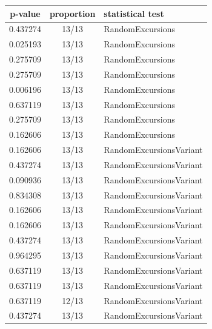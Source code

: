 \documentclass[conference]{IEEEtran}
\begin{document}
\begin{center}
\begin{table}[H]
\renewcommand{\arraystretch}{1.2}
\centering
\begin{tabular}{|c|c|l|}
\hline
\textbf{p-value} & \textbf{proportion} & \textbf{statistical test} \\ \hline
0.437274         & 13/13               & RandomExcursions          \\ \hline
0.025193         & 13/13               & RandomExcursions          \\ \hline
0.275709         & 13/13               & RandomExcursions          \\ \hline
0.275709         & 13/13               & RandomExcursions          \\ \hline
0.006196         & 13/13               & RandomExcursions          \\ \hline
0.637119         & 13/13               & RandomExcursions          \\ \hline
0.275709         & 13/13               & RandomExcursions          \\ \hline
0.162606         & 13/13               & RandomExcursions          \\ \hline
0.162606         & 13/13               & RandomExcursionsVariant   \\ \hline
0.437274         & 13/13               & RandomExcursionsVariant   \\ \hline
0.090936         & 13/13               & RandomExcursionsVariant   \\ \hline
0.834308         & 13/13               & RandomExcursionsVariant   \\ \hline
0.162606         & 13/13               & RandomExcursionsVariant   \\ \hline
0.162606         & 13/13               & RandomExcursionsVariant   \\ \hline
0.437274         & 13/13               & RandomExcursionsVariant   \\ \hline
0.964295         & 13/13               & RandomExcursionsVariant   \\ \hline
0.637119         & 13/13               & RandomExcursionsVariant   \\ \hline
0.637119         & 13/13               & RandomExcursionsVariant   \\ \hline
0.637119         & 12/13               & RandomExcursionsVariant   \\ \hline
0.437274         & 13/13               & RandomExcursionsVariant   \\ \hline

\end{tabular}
\end{table}
\end{center}
\end{document}
